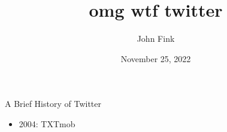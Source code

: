 \documentclass{beamer}
\title{omg wtf twitter}
\author{John Fink}
\date{November 25, 2022}
\begin{document}
\begin{frame}[plain]
    \maketitle
\end{frame}
\begin{frame}{A Brief History of Twitter}
	\begin{itemize}
		\pause
		\item 2004: TXTmob
	\end{itemize}
	\pause
\end{frame}
\end{document}
